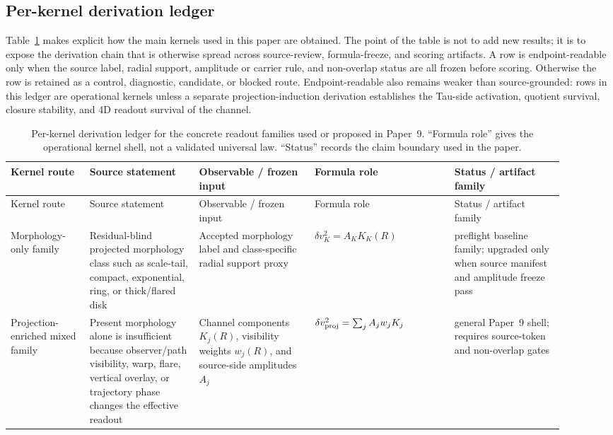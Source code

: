 \documentclass[11pt]{article}
\begin{document}
\begin{landscape}
\section{Per-kernel derivation ledger}
\label{sec:per-kernel-derivation-ledger}

Table~\ref{tab:per-kernel-derivation-ledger} makes explicit how the main
kernels used in this paper are obtained.  The point of the table is not to add
new results; it is to expose the derivation chain that is otherwise spread
across source-review, formula-freeze, and scoring artifacts.  A row is
endpoint-readable only when the source label, radial support, amplitude or
carrier rule, and non-overlap status are all frozen before scoring.  Otherwise
the row is retained as a control, diagnostic, candidate, or blocked route.
Endpoint-readable also remains weaker than source-grounded: rows in this ledger
are operational kernels unless a separate projection-induction derivation
establishes the Tau-side activation, quotient survival, closure stability, and
4D readout survival of the channel.

\begingroup
\scriptsize
\setlength{\tabcolsep}{2pt}
\begin{longtable}{@{}p{0.13\linewidth}p{0.18\linewidth}p{0.19\linewidth}p{0.23\linewidth}p{0.18\linewidth}@{}}
\caption{Per-kernel derivation ledger for the concrete readout families used
or proposed in Paper~9.  ``Formula role'' gives the operational kernel shell,
not a validated universal law.  ``Status'' records the claim boundary used in
the paper.}
\label{tab:per-kernel-derivation-ledger}\\
\toprule
Kernel route & Source statement & Observable / frozen input & Formula role & Status / artifact family \\
\midrule
\endfirsthead
\toprule
Kernel route & Source statement & Observable / frozen input & Formula role & Status / artifact family \\
\midrule
\endhead
\bottomrule
\endfoot

Morphology-only family &
Residual-blind projected morphology class such as scale-tail, compact,
exponential, ring, or thick/flared disk &
Accepted morphology label and class-specific radial support proxy &
\(\delta v_K^2=A_KK_K(R)\) &
preflight baseline family; upgraded only when source manifest and amplitude
freeze pass \\

Projection-enriched mixed family &
Present morphology alone is insufficient because observer/path visibility,
warp, flare, vertical overlay, or trajectory phase changes the effective readout &
Channel components \(K_j(R)\), visibility weights \(w_j(R)\), and source-side
amplitudes \(A_j\) &
\(\delta v_{\rm proj}^2=\sum_j A_jw_jK_j\) &
general Paper~9 shell; requires source-token and non-overlap gates \\


\end{longtable}
\end{landscape}
\end{document}
